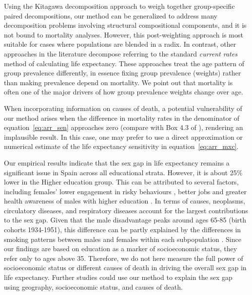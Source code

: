 \documentclass[12pt, sn-apa,pdflatex,letterpaper]{sn-jnl}
\begin{document}
Using the Kitagawa decomposition approach \citep{kitagawa1955components} to weigh together group-specific paired decompositions, our method can be generalized to address many decomposition problems involving structural compositional components, and it is not bound to mortality analyses. However, this post-weighting approach is most suitable for cases where populations are blended in a radix. In contrast, other approaches in the literature  \citep{torres2019contribution,su2023educational,su2024subnational,hendi2021immigration} decompose referring to the standard \emph{current rates} \citep{vaupel2002life} method of calculating life expectancy. These approaches treat the age pattern of group prevalence differently, in essence fixing group prevalence (weights) rather than making prevalence depend on mortality. We point out that mortality is often one of the major drivers of how group prevalence weights change over age.

 When incorporating information on causes of death, a potential vulnerability of our method arises when the difference in mortality rates in the denominator of equation~\eqref{eq:arr_sen} approaches zero (compare with Box 4.3 of \citet{preston2000demography}), rendering an implausible result. In this case, one may prefer to use a direct approximation or numerical estimate of the life expectancy sensitivity in equation~\eqref{eq:arr_mxc}.

Our empirical results indicate that the sex gap in life expectancy remains a significant issue in Spain across all educational strata. However, it is about 25\% lower in the Higher education group. This can be attributed to several factors, including females' lower engagement in risky behaviours \citep{ross2012education,cook2001knowing,byrnes1999gender,kritsotakis2016gender,olson2017gender}, better jobs and greater health awareness of males with higher education \citep{lawrence2017college,ross1995links,ross2012education, mcmahon2009higher}. In terms of causes, neoplasms, circulatory diseases, and respiratory diseases account for the largest contributions to the sex gap. Given that the male disadvantage peaks around ages 65-85 (birth cohorts 1934-1951), this difference can be partly explained by the differences in smoking patterns between males and females within each subpopulation \citep{haeberer2020social}. Since our findings are based on education as a marker of socioeconomic status, they refer only to ages above 35. Therefore, we do not here measure the full power of socioeconomic status or different causes of death in driving the overall sex gap in life expectancy. Further studies could use our method to explain the sex gap using geography, socioeconomic status, and causes of death.
\end{document}
